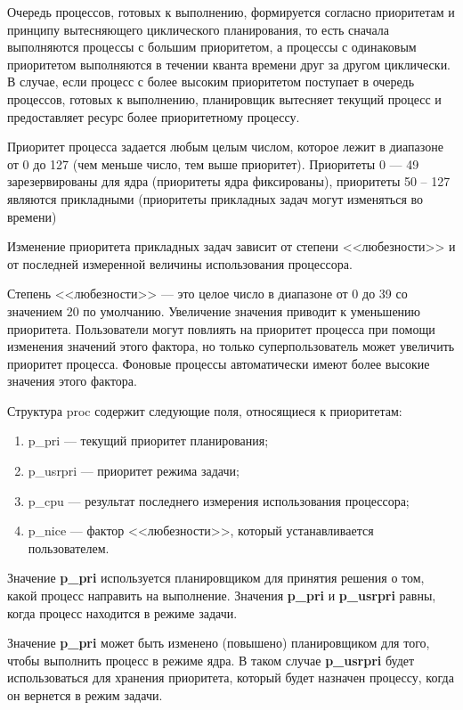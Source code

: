 Очередь процессов, готовых к выполнению, формируется согласно приоритетам и принципу вытесняющего циклического планирования, то есть сначала выполняются процессы с большим приоритетом, а процессы с одинаковым приоритетом выполняются в течении кванта времени друг за другом циклически. 
В случае, если процесс с более высоким приоритетом поступает в очередь процессов, готовых к выполнению, планировщик вытесняет текущий процесс и предоставляет ресурс более приоритетному процессу.

Приоритет процесса задается любым целым числом, которое лежит в диапазоне от 0 до 127 (чем меньше число, тем выше приоритет). Приоритеты 0 --- 49 зарезервированы для ядра (приоритеты ядра фиксированы), приоритеты 50 -- 127 являются прикладными  (приоритеты прикладных задач могут изменяться во времени)

Изменение приоритета прикладных задач зависит от степени <<любезности>> и от последней измеренной величины использования процессора.

Степень <<любезности>> --- это целое число в диапазоне от 0 до 39 со значением 20 по умолчанию. 
Увеличение значения приводит к уменьшению приоритета.
Пользователи могут повлиять на приоритет процесса при помощи изменения значений этого фактора, но только суперпользователь может увеличить приоритет процесса.
Фоновые процессы автоматически имеют более высокие значения этого фактора.

Структура proc содержит следующие поля, относящиеся к приоритетам:
\begin{enumerate}[label=\arabic*)]
	\item p\_pri --- текущий приоритет планирования;
	\item p\_usrpri --- приоритет режима задачи;
	\item p\_cpu --- результат последнего измерения использования процессора;
	\item p\_nice --- фактор <<любезности>>, который устанавливается пользователем.
\end{enumerate}

Значение \textbf{p\_pri} используется планировщиком для принятия решения о том, какой процесс направить на выполнение. Значения \textbf{p\_pri} и \textbf{p\_usrpri} равны, когда процесс находится в режиме задачи. 

Значение \textbf{p\_pri} может быть изменено (повышено) планировщиком для того, чтобы выполнить процесс в режиме ядра. В таком случае \textbf{p\_usrpri} будет использоваться для хранения приоритета, который будет назначен процессу, когда он вернется в режим задачи.

